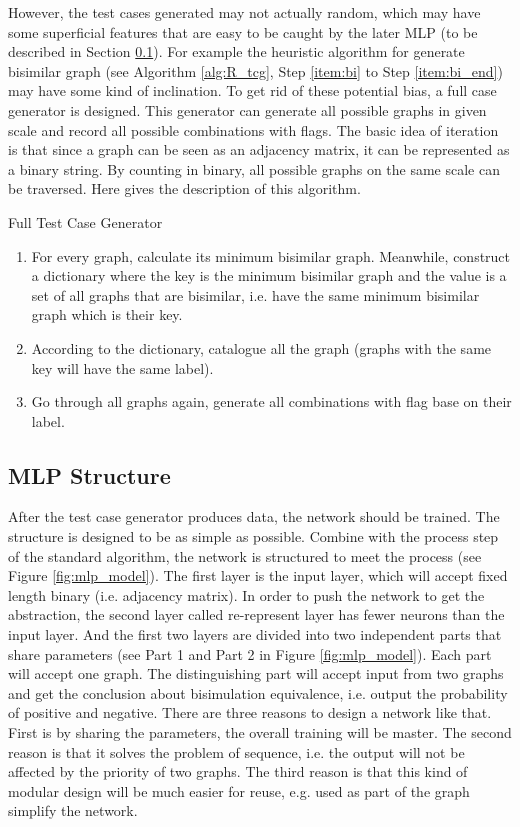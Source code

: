 However, the test cases generated may not actually random, which may have some superficial features that are easy to be caught by the later MLP (to be described in Section \ref{sec:des:ml}).
For example the heuristic algorithm for generate bisimilar graph (see Algorithm \ref{alg:R_tcg}, Step \ref{item:bi} to Step \ref{item:bi_end}) may have some kind of inclination.
To get rid of these potential bias, a full case generator is designed.
This generator can generate all possible graphs in given scale and record all possible combinations with flags.
The basic idea of iteration is that since a graph can be seen as an adjacency matrix, it can be represented as a binary string.
By counting in binary, all possible graphs on the same scale can be traversed.
Here gives the description of this algorithm.
\begin{algor}
\label{alg:F_tcg}
Full Test Case Generator
\begin{enumerate}
    \item For every graph, calculate its minimum bisimilar graph. Meanwhile, construct a dictionary where the key is the minimum bisimilar graph and the value is a set of all graphs that are bisimilar, i.e. have the same minimum bisimilar graph which is their key.
    \item According to the dictionary, catalogue all the graph (graphs with the same key will have the same label).
    \item Go through all graphs again, generate all combinations with flag base on their label.
\end{enumerate}
\end{algor}

\subsection{MLP Structure}
\label{sec:des:ml}
After the test case generator produces data, the network should be trained.
The structure is designed to be as simple as possible.
Combine with the process step of the standard algorithm, the network is structured to meet the process (see Figure \ref{fig:mlp_model}).
The first layer is the input layer, which will accept fixed length binary (i.e. adjacency matrix).
In order to push the network to get the abstraction, the second layer called re-represent layer has fewer neurons than the input layer. 
And the first two layers are divided into two independent parts that share parameters (see Part 1 and Part 2 in Figure \ref{fig:mlp_model}).
Each part will accept one graph.
The distinguishing part will accept input from two graphs and get the conclusion about bisimulation equivalence, i.e. output the probability of positive and negative.
There are three reasons to design a network like that.
First is by sharing the parameters, the overall training will be master.
The second reason is that it solves the problem of sequence, i.e. the output will not be affected by the priority of two graphs.
The third reason is that this kind of modular design will be much easier for reuse, e.g. used as part of the graph simplify the network.

